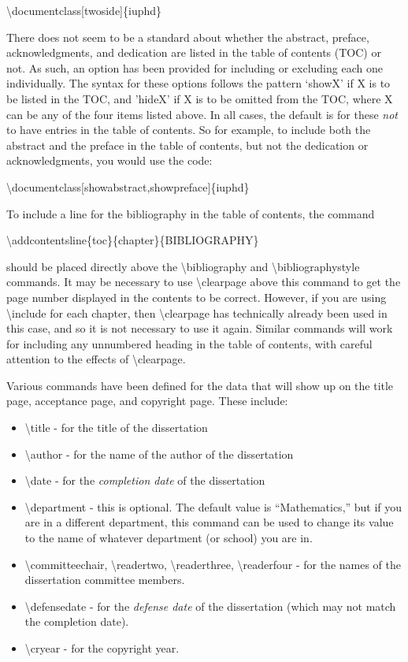 \textbackslash documentclass[twoside]\{iuphd\}
\medskip

There does not seem to be a standard about whether the abstract, preface, acknowledgments, and dedication are listed in the table of
contents (TOC) or not.  As such, an option has been provided for including or excluding each one individually.  The syntax for these options
follows the pattern `showX' if X is to be listed in the TOC, and 'hideX' if X is to be omitted from the TOC, where X can be any of the four
items listed above.  In all cases, the default is for these \emph{not} to have entries in the table of contents.  So for example, to include
both the abstract and the preface in the table of contents, but not the dedication or acknowledgments, you would use the code:
\medskip

\textbackslash documentclass[showabstract,showpreface]\{iuphd\}
\medskip

\noindent To include a line for the bibliography in the table of contents, the command
\medskip

\textbackslash addcontentsline\{toc\}\{chapter\}\{BIBLIOGRAPHY\}
\medskip

\noindent should be placed directly above the \textbackslash bibliography and \textbackslash bibliographystyle commands.  It may be necessary
to use \textbackslash clearpage above this command to get the page number displayed in the contents to be correct.  However, if you are using
\textbackslash include for each chapter, then \textbackslash clearpage has technically already been used in this case, and so it is not
necessary to use it again. Similar commands will work for including any unnumbered heading in the table of contents, with careful attention
to the effects of \textbackslash clearpage.

Various commands have been defined for the data that will show up on the title page, acceptance page, and copyright page.  These include:
\begin{itemize}
 \item \textbackslash title - for the title of the dissertation
 \item \textbackslash author - for the name of the author of the dissertation
 \item \textbackslash date - for the \emph{completion date} of the dissertation
 \item \textbackslash department - this is optional.  The default value is ``Mathematics,'' but if you are in a different department, this
        command can be used to change its value to the name of whatever department (or school) you are in.  
 \item \textbackslash committeechair, \textbackslash readertwo, \textbackslash readerthree, \textbackslash readerfour - for the names of the
                      dissertation committee members.
 \item \textbackslash defensedate - for the \emph{defense date} of the dissertation (which may not match the completion date).
 \item \textbackslash cryear - for the copyright year.
\end{itemize}

